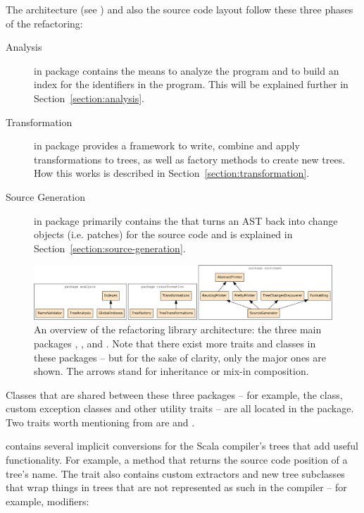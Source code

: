 The architecture (see ) and also the source code layout follow these three phases of the refactoring:

\begin{description}
 \item[Analysis] in package  contains the means to analyze the program and to build an index for the identifiers in the program. This will be explained further in Section~\vref{section:analysis}.
 \item[Transformation] in package  provides a framework to write, combine and apply transformations to trees, as well as factory methods to create new trees. How this works is described in Section~\vref{section:transformation}.
 \item[Source Generation] in package  primarily contains the  that turns an AST back into change objects (i.e. patches) for the source code and is explained in Section~\vref{section:source-generation}.
\end{description}

\begin{figure}
  \centering
  \includegraphics[width=\linewidth]{refactoring-architecture.pdf}
  \caption{An overview of the refactoring library architecture: the three main packages , , and . Note that there exist more traits and classes in these packages -- but for the sake of clarity, only the major ones are shown. The arrows stand for inheritance or mix-in composition.}
  \label{figure:refactoring-architecture}
\end{figure}

Classes that are shared between these three packages -- for example, the  class, custom exception classes and other utility traits -- are all located in the  package. Two traits worth mentioning from  are  and .

 contains several implicit conversions for the Scala compiler's trees that add useful functionality. For example, a  method that returns the source code position of a tree's name. The trait also contains custom extractors and new tree subclasses that wrap things in trees that are not represented as such in the compiler -- for example, modifiers:

